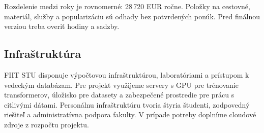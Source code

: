 \documentclass[11pt,a4paper]{article}
\begin{document}
Rozdelenie medzi roky je rovnomerné: 28\,720 EUR ročne. Položky na cestovné, materiál, služby a popularizáciu sú odhady bez potvrdených ponúk. Pred finálnou verziou treba overiť hodiny a sadzby.

\subsection{Infraštruktúra}

FIIT STU disponuje výpočtovou infraštruktúrou, laboratóriami a prístupom k vedeckým databázam. Pre projekt využijeme servery s GPU pre trénovanie transformerov, úložisko pre datasety a zabezpečené prostredie pre prácu s citlivými dátami. Personálnu infraštruktúru tvoria štyria študenti, zodpovedný riešiteľ a administratívna podpora fakulty. V prípade potreby doplníme cloudové zdroje z rozpočtu projektu.

{\small


}
\end{document}
